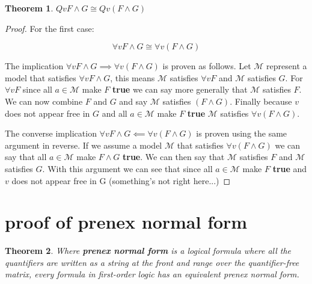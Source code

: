 \documentclass[a4paper,11pt]{article}
\newtheorem{thm}{Theorem}[section]
\begin{document}
\setcounter{equation}{0}

\pagebreak

\begin{thm}$Qv F \land G \cong Qv(F \land G)$\end{thm}

	\begin{proof}
		For the first case:
	
		\begin{equation} \forall v F \land G \cong \forall v(F \land G) \end{equation}
	
		The implication $\forall v F \land G \implies \forall v(F \land G)$ is proven as follows. 
		Let $\mathcal{M}$ represent a model
		that satisfies $\forall v F \land G$, this means $\mathcal{M}$ satisfies $\forall v F$ 
		and $\mathcal{M}$ satisfies $G$. For $\forall v F$ since all $a \in \mathcal{M}$ make
		$F$ \textbf{true} we can say more generally that $\mathcal{M}$ satisfies $F$. We can now
		combine $F$ and $G$ and say $\mathcal{M}$ satisfies $(F \land G)$. Finally because 
		$v$ does not appear free in $G$ and all $a \in \mathcal{M}$ make $F$ \textbf{true}
		$\mathcal{M}$ satisfies $\forall v(F \land G)$. 
		
		The converse implication $\forall v F \land G \impliedby \forall v(F \land G)$ is proven using 
		the same argument in reverse. If we assume a model $\mathcal{M}$ that satisfies 
		$\forall v(F \land G)$ we can say that all $a \in \mathcal{M}$ make $F \land G$ \textbf{true}.
		We can then say that $\mathcal{M}$ satisfies $F$ and $\mathcal{M}$ satisfies $G$. With
		this argument we can see that since all $a \in \mathcal{M}$ make $F$ \textbf{true} and $v$
		does not appear free in G (something's not right here...)
	\end{proof}
	
\setcounter{equation}{0}

	
\section{proof of prenex normal form}

\begin{thm} Where \textbf{prenex normal form} is a logical formula where all the quantifiers are written as a string at the front and range over the quantifier-free matrix, every formula in first-order logic has an equivalent prenex normal form. \end{thm}
\end{document}
